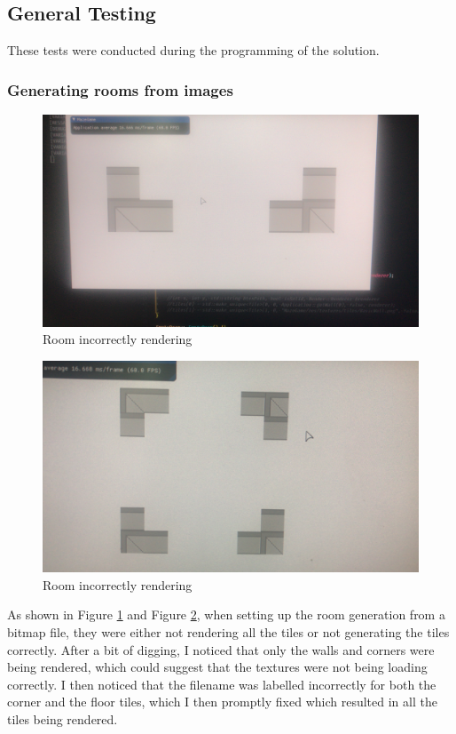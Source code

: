 \documentclass[../Main.tex]{subfiles}
\begin{document}
    \subsection{General Testing}
        These tests were conducted during the programming of the solution.
        \subsubsection{Generating rooms from images}
            \begin{figure}[hbt!]
                \centerline{\includegraphics[scale=0.1]{img/Testing/General/Room Not rendering.jpg}}
                \caption{Room incorrectly rendering}
                \label{fig:roomNotRendering1}
            \end{figure}
            \begin{figure}[hbt!]
                \centerline{\includegraphics[scale=0.1]{img/Testing/General/Room Not rendering2.jpg}}
                \caption{Room incorrectly rendering}
                \label{fig:roomNotRendering2}
            \end{figure}
            As shown in Figure \ref{fig:roomNotRendering1} and Figure \ref{fig:roomNotRendering2}, when setting up the room generation from a bitmap file, they were either not rendering all the tiles or not generating the tiles correctly. After a bit of digging, I noticed that only the walls and corners were being rendered, which could suggest that the textures were not being loading correctly. I then noticed that the filename was labelled incorrectly for both the corner and the floor tiles, which I then promptly fixed which resulted in all the tiles being rendered.
\end{document}

